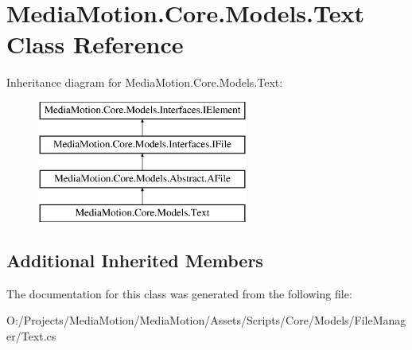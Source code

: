 \hypertarget{class_media_motion_1_1_core_1_1_models_1_1_text}{\section{Media\+Motion.\+Core.\+Models.\+Text Class Reference}
\label{class_media_motion_1_1_core_1_1_models_1_1_text}
}
Inheritance diagram for Media\+Motion.\+Core.\+Models.\+Text\+:\begin{figure}[H]
\begin{center}
\leavevmode
\includegraphics[height=4.000000cm]{class_media_motion_1_1_core_1_1_models_1_1_text}
\end{center}
\end{figure}
\subsection*{Additional Inherited Members}


The documentation for this class was generated from the following file\+:\begin{DoxyCompactItemize}
\item 
O\+:/\+Projects/\+Media\+Motion/\+Media\+Motion/\+Assets/\+Scripts/\+Core/\+Models/\+File\+Manager/Text.\+cs\end{DoxyCompactItemize}
